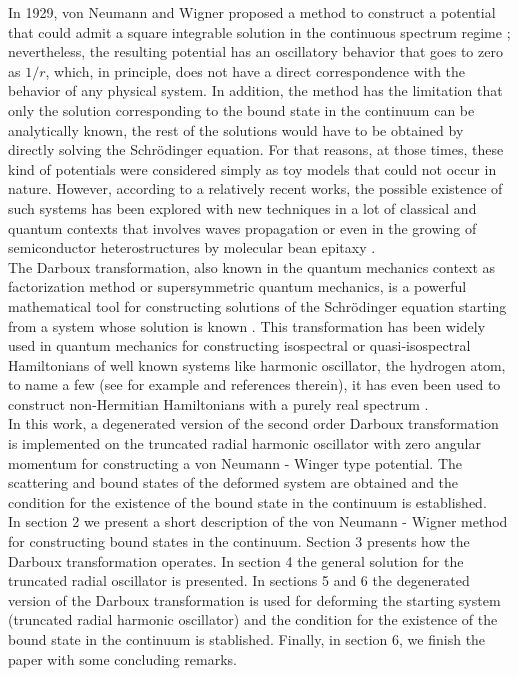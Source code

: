 \documentclass[a4paper]{jpconf}
\begin{document}
In 1929, von Neumann and Wigner proposed a method to construct a potential that could admit a square integrable solution in the continuous spectrum regime \cite{vNW}; nevertheless, the resulting potential has an oscillatory behavior that goes to zero as $1/r$, which, in principle, does not have a direct correspondence with the behavior of any physical system. In addition, the method has the limitation that only the solution corresponding to the bound state in the continuum can be analytically known, the rest of the solutions would have to be obtained by directly solving the Schr\" odinger equation. For that reasons, at those times, these kind of potentials were considered simply as toy models that could not  occur in nature. However, according to a relatively recent works, the possible existence of such systems has been explored with new techniques in a lot of classical and quantum contexts that involves waves propagation or even in the growing of semiconductor heterostructures by molecular bean epitaxy \cite{Stillinger,Anzor,Stahlhofen,Nature,Pappademos,Mondragon,Nico1,Nico2,Capasso}.\\
The Darboux transformation, also known in the quantum mechanics context as factorization method or supersymmetric quantum mechanics, is a powerful mathematical tool for constructing solutions of the Schr\" odinger equation starting from a system whose solution is known \cite{Witten,Mielnik,Darboux}. This transformation has been widely used in quantum mechanics for constructing isospectral or quasi-isospectral Hamiltonians of well known systems like harmonic oscillator, the hydrogen atom, to name a few (see for example \cite{David,Oscar} and references therein), it has even been used to construct non-Hermitian Hamiltonians with a purely real spectrum \cite{Zurika,Nico3}.\\
In this work, a degenerated version of the  second order Darboux transformation is implemented on the truncated radial harmonic oscillator with zero angular momentum for constructing a von Neumann - Winger type potential.  The scattering and bound states of the deformed system are obtained and the condition for the existence of the bound state in the continuum is established.\\
In section 2 we present a short description of the von Neumann - Wigner method for constructing bound states in the continuum. Section 3 presents how the Darboux transformation operates. In section 4 the general solution for the truncated radial oscillator is presented. In sections 5 and 6 the degenerated version of the Darboux transformation is used for deforming the starting system (truncated radial harmonic oscillator) and the condition for the existence of the bound state in the continuum is stablished. Finally, in section 6, we finish the paper with some concluding remarks.
\end{document}
